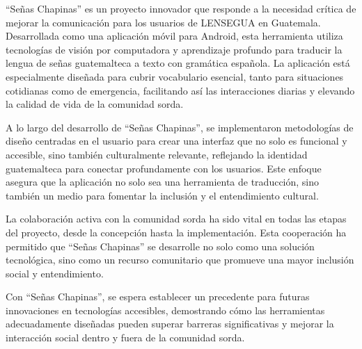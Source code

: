 ``Señas Chapinas'' es un proyecto innovador que responde a la necesidad crítica de mejorar la comunicación para los usuarios de LENSEGUA en Guatemala. Desarrollada como una aplicación móvil para Android, esta herramienta utiliza tecnologías de visión por computadora y aprendizaje profundo para traducir la lengua de señas guatemalteca a texto con gramática española. La aplicación está especialmente diseñada para cubrir vocabulario esencial, tanto para situaciones cotidianas como de emergencia, facilitando así las interacciones diarias y elevando la calidad de vida de la comunidad sorda.

A lo largo del desarrollo de ``Señas Chapinas'', se implementaron metodologías de diseño centradas en el usuario para crear una interfaz que no solo es funcional y accesible, sino también culturalmente relevante, reflejando la identidad guatemalteca para conectar profundamente con los usuarios. Este enfoque asegura que la aplicación no solo sea una herramienta de traducción, sino también un medio para fomentar la inclusión y el entendimiento cultural.

La colaboración activa con la comunidad sorda ha sido vital en todas las etapas del proyecto, desde la concepción hasta la implementación. Esta cooperación ha permitido que ``Señas Chapinas'' se desarrolle no solo como una solución tecnológica, sino como un recurso comunitario que promueve una mayor inclusión social y entendimiento.

Con ``Señas Chapinas'', se espera establecer un precedente para futuras innovaciones en tecnologías accesibles, demostrando cómo las herramientas adecuadamente diseñadas pueden superar barreras significativas y mejorar la interacción social dentro y fuera de la comunidad sorda.